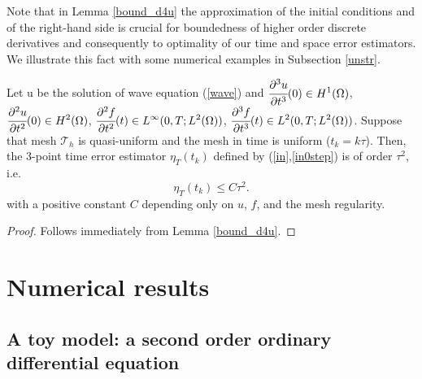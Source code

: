 \documentclass{imanum}
\newcommand{\Th}{\mathcal{T}_h}
\begin{document}
\begin{remark}
Note that in Lemma \ref{bound_d4u} the approximation of the initial conditions and of the right-hand side is crucial for boundedness of higher order discrete derivatives and consequently to optimality of our time and space error estimators. We illustrate this fact with some numerical examples in Subsection \ref{unstr}.  
\end{remark}
\begin{corollary}
Let u be the solution of wave equation (\ref{wave}) and 
$\displaystyle\cfrac{\partial^{3}u}{\partial t^{3}}(0)\in {H^1(\Omega)}$, $\displaystyle\cfrac{\partial^{2}u}{\partial t^{2}}(0) \in {H^2(\Omega)}$, $\displaystyle\cfrac{\partial^{2}f}{\partial t^{2}}(t)\in L^{\infty}(0,T;{L^2(\Omega)})$, $\displaystyle\cfrac{\partial^{3}f}{\partial t^{3}}(t)\in L^{2}(0,T;{L^2(\Omega)})$. Suppose that mesh $\Th$ is quasi-uniform and the mesh in time is uniform ($t_k=k\tau$). Then, the 3-point time error estimator $\eta_T(t_k)$ defined by (\ref{in},\ref{in0step}) is of order $\tau^2$, i.e. 
\begin{equation}
\eta_T(t_k)\leq C \tau^2.\label{upperOpt}
\end{equation}
with a positive constant $C$ depending only on $u$, $f$, and the mesh regularity.
\end{corollary}
\begin{proof}
Follows immediately from Lemma \ref{bound_d4u}. 
\end{proof}
\section{Numerical results}\label{section4}
\subsection{A toy model: a second order ordinary differential equation}
\end{document}
